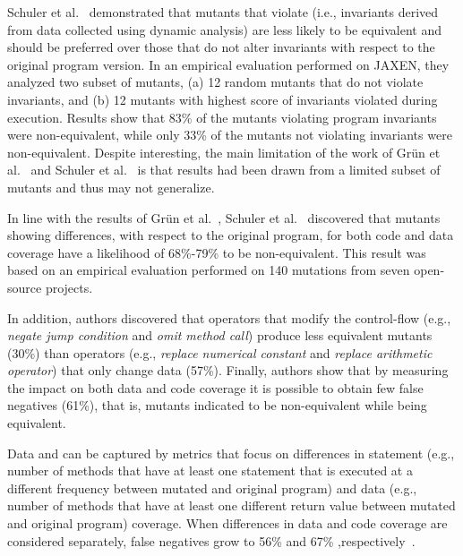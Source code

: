 Schuler et al.~\cite{schuler2009efficient} demonstrated that mutants that violate  (i.e., invariants derived from data collected using dynamic analysis) are less likely to be equivalent and should be preferred over those that do not alter invariants with respect to the original program version. In an empirical evaluation performed on JAXEN, they analyzed two subset of mutants, 
(a) 12 random mutants that do not violate invariants, and (b) 12 mutants with highest score of invariants violated during execution. 
Results show that 83\% of the mutants violating program invariants were non-equivalent, while only 33\% of 
the mutants not violating invariants were non-equivalent.
Despite interesting, the main limitation of the work of Gr\"{u}n et al.~\cite{grun2009impact} and Schuler et al.~\cite{schuler2009efficient} is that results had been drawn from a limited subset of mutants and thus may not generalize.


In line with the results of Gr\"{u}n et al.~\cite{grun2009impact}, Schuler et al.~\cite{schuler2010covering,schuler2013covering} discovered that mutants showing 
differences, with respect to the original program, for both code and data coverage have a likelihood of 68\%-79\% to be non-equivalent.
This result was based on an empirical evaluation performed on 140 mutations from seven open-source projects.

In addition, authors discovered that operators that modify the control-flow (e.g., \textit{negate jump condition} and \textit{omit method call}) produce less equivalent mutants (30\%) 
than operators (e.g., \textit{replace numerical constant} and \textit{replace arithmetic operator}) that only change data (57\%).
Finally, 
 authors show that by measuring the impact on both data and code coverage it is possible to obtain few false negatives (61\%), that is, mutants indicated to be non-equivalent while being equivalent. 

Data and  can be captured by metrics that focus on differences in statement (e.g., number of methods that have at least one statement that is executed at a different frequency between mutated and original program) and data (e.g., number of methods that have at least one different return value between mutated and original program) coverage. 
When differences in data and code coverage are considered separately, false negatives grow to 56\% and 67\% ,respectively~\cite{schuler2013covering}.

